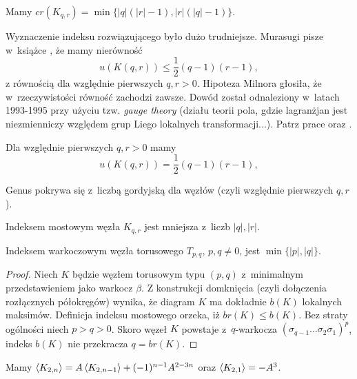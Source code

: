 \begin{proposition}[Murasugi, 1991]
    Mamy $cr(K_{q,r}) = \min\{|q|(|r| -1), |r|(|q|-1)\}$.
\end{proposition}

Wyznaczenie indeksu rozwiązującego było dużo trudniejsze.
Murasugi pisze w~książce \cite{murasugi96}, że mamy nierówność
\[
    u(K(q, r)) \le \frac 12 (q-1)(r-1),
\]
z równością dla względnie pierwszych $q, r > 0$.
Hipoteza Milnora głosiła, że w~rzeczywistości równość zachodzi zawsze.
Dowód został odnaleziony w~latach 1993-1995 przy użyciu tzw. \emph{gauge theory} (działu teorii pola, gdzie lagranżjan jest niezmienniczy względem grup Liego lokalnych transformacji...).
Patrz prace \cite{kronheimer93} oraz \cite{kronheimer95}.

\begin{proposition} \label{torus_unknotting}
    Dla względnie pierwszych $q, r > 0$ mamy
    \[
        u(K(q, r)) = \frac 12 (q-1)(r-1),
    \]
\end{proposition}

Genus pokrywa się z~liczbą gordyjską dla węzłów (czyli względnie pierwszych $q, r$).

\begin{proposition} \label{torus_bridge}
    Indeksem mostowym węzła $K_{q,r}$ jest mniejsza z~liczb $|q|, |r|$.
\end{proposition}

\begin{corollary}
    \label{braid-for-forus}
    Indeksem warkoczowym węzła torusowego $T_{p, q}$, $p, q \neq 0$, jest $\min\{|p|, |q|\}$.
\end{corollary}

\begin{proof}
    Niech $K$ będzie węzłem torusowym typu $(p,q)$ z~minimalnym przedstawieniem jako warkocz $\beta$.
    Z konstrukcji domknięcia (czyli dołączenia rozłącznych półokręgów) wynika,
    że diagram $K$ ma dokładnie $b(K)$ lokalnych maksimów.
    Definicja indeksu mostowego orzeka, iż $br(K) \le b(K)$.
    Bez straty ogólności niech $p > q > 0$.
    Skoro węzeł $K$ powstaje z~$q$-warkocza $(\sigma_{q-1} \ldots \sigma_2\sigma_1)^p$,
    indeks $b(K)$ nie przekracza $q = br(K)$.
\end{proof}

\begin{proposition}
    Mamy $\left\langle{K_{2, n}}\right\rangle = A \left\langle{K_{2,n-1}}\right\rangle + (-1)^{n-1} A^{2-3n}$
    oraz $\left\langle{K_{2,1}}\right\rangle = -A^3$.
\end{proposition}

